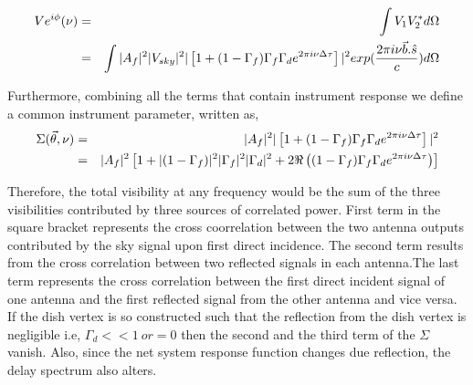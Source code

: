 \documentclass[12pt,preprint]{aastex}
\begin{document}
\begin{eqnarray}
V e^{i\phi}(\nu) & = & \int V_{1}V_{2}^{*} d\Omega \nonumber\\
		        & = & \int |A_{f}|^{2}|V_{sky}|^{2} |\left [ 1+(1-\Gamma_{f}) \Gamma_{f} \Gamma_{d} e^{2\pi i\nu \Delta \tau}  \right]|^{2} exp({2\pi i \nu \vec{b}.\hat{s} \over c} ) d\Omega
\label{eq6}		        
\end{eqnarray}


 Furthermore, combining all the terms that contain instrument response we define a common instrument parameter, written as, 
\begin{eqnarray}
\Sigma(\vec \theta, \nu) & = & |A_{f}|^{2} |\left [ 1+ (1-\Gamma_{f}) \Gamma_{f} \Gamma_{d} e^{2\pi i\nu \Delta \tau} \right]|^{2}\nonumber\\
 	    & = &  |A_{f}|^{2}  \left[ 1+ |(1-\Gamma_{f})|^{2}|\Gamma_{f}|^{2}|\Gamma_{d}|^{2} + 2 \Re \left ( (1-\Gamma_{f})\Gamma_{f}\Gamma_{d} e^{2\pi i\nu \Delta \tau} \right) \right]
\label{eq{7}}	    
\end{eqnarray}

Therefore, the total visibility at any frequency would be the sum of the three visibilities contributed by three sources of correlated power. First term in the square bracket represents the cross coorrelation between the two antenna outputs contributed by the sky signal upon first direct incidence. The second term results from the cross correlation between two reflected signals in each antenna.The last term represents the cross correlation between the first direct incident signal of one antenna and the first reflected signal from the other antenna and vice versa.
If the dish vertex is so constructed such that the reflection from the dish vertex is negligible i.e, $\Gamma_{d}<<1\ or = 0$ then the second and the third term of the $\Sigma$ vanish. Also, since the net system response function changes due reflection, the delay spectrum also alters.\\



\end{document}
